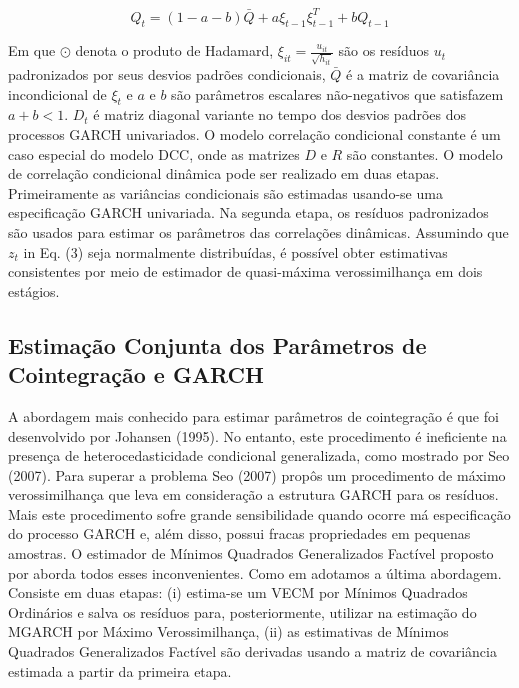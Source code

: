    \begin{equation}
   Q_{t}=(1-a-b) \bar{Q} + a \xi_{t-1} \xi_{t-1}^T+bQ_{t-1}
   \end{equation}
   
 Em que $\odot$ denota o produto de Hadamard, $\xi_{it} =  \frac{u_{it}}{\sqrt{h_{it}}}$  são os resíduos $u_t$ padronizados  por seus desvios padrões condicionais, $\bar{Q}$ é a matriz de covariância incondicional de $\xi_{t}$ e $a$ e $b$ são parâmetros escalares não-negativos que satisfazem $a + b<1$. $D_t$ é matriz diagonal variante no tempo dos desvios padrões dos processos GARCH univariados. O modelo correlação condicional constante é um caso especial do modelo DCC, onde as matrizes $D$ e $R$ são constantes.
 O modelo de correlação condicional dinâmica pode ser realizado em duas etapas. Primeiramente as variâncias condicionais são estimadas usando-se uma especificação GARCH univariada. Na segunda etapa, os resíduos padronizados são usados para estimar os parâmetros das correlações dinâmicas.
 Assumindo que $z_t$ in Eq. (3) seja normalmente distribuídas, é possível obter estimativas consistentes por meio de estimador de quasi-máxima verossimilhança em dois estágios.  
 	
 \subsection{Estimação Conjunta dos Parâmetros de Cointegração e GARCH} 
 

	A abordagem mais conhecido para estimar parâmetros de cointegração é que foi desenvolvido por Johansen (1995). No entanto, este procedimento é ineficiente na presença de heterocedasticidade condicional generalizada, como mostrado por Seo (2007). Para superar a problema Seo (2007) propôs um procedimento de máximo verossimilhança que leva em consideração a estrutura GARCH para os resíduos. Mais este procedimento sofre grande sensibilidade quando ocorre má especificação do  processo GARCH e, além disso, possui fracas propriedades em pequenas amostras.  O estimador de Mínimos Quadrados Generalizados Factível proposto por  aborda todos esses inconvenientes. Como em   adotamos a última abordagem. Consiste em duas etapas: (i) estima-se um VECM por Mínimos Quadrados Ordinários e salva os resíduos  para,  posteriormente, utilizar na estimação do MGARCH por Máximo Verossimilhança, (ii) as estimativas de Mínimos Quadrados Generalizados Factível são derivadas usando a matriz de covariância estimada a partir da primeira etapa.
	
